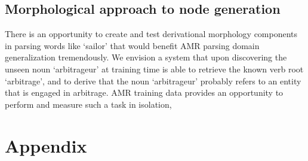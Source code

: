 \documentclass[11pt]{article}
\begin{document}
\subsection{Morphological approach to node generation}
There is an opportunity to create and test derivational morphology components in parsing words like `sailor' that would benefit AMR parsing domain generalization tremendously. We envision a system that upon discovering the unseen noun `arbitrageur' at training time is able to retrieve the known verb root `arbitrage', and to derive that the noun `arbitrageur' probably refers to an entity that is engaged in arbitrage. AMR training data provides an opportunity to perform and measure such a task in isolation, 

\section{Appendix}
\end{document}
